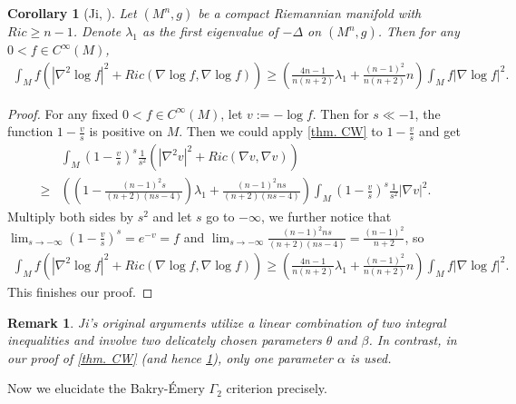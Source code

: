 \documentclass[11pt]{amsart}
\newtheorem{corollary}{Corollary}
\newtheorem{remark}{Remark}
\numberwithin{equation}{section}
\numberwithin{lemma}{section}
\numberwithin{proposition}{section}
\numberwithin{corollary}{section}
\numberwithin{remark}{section}
\begin{document}
    \begin{corollary}[Ji, \cite{Ji24}]\label{cor. recover Ji}
        Let $(M^n,g)$ be a compact Riemannian manifold with $Ric\geq n-1$. Denote $\lambda_1$ as the first eigenvalue of $-\Delta $ on $(M^n,g)$. Then for any $0<f\in C^{\infty}(M)$,
        \begin{align*}
        \int_M f(|\nabla^2\log f|^2+Ric(\nabla \log f,\nabla \log f))
        \geq 
        \left(
        \frac{4n-1}{n(n+2)}\lambda_1
            +\frac{(n-1)^2}{n(n+2)}n
        \right)
            \int_M f|\nabla \log f|^2.
        \end{align*}
\end{corollary}
\begin{proof}
    For any fixed $0<f\in C^{\infty}(M)$, let $v:=-\log f$. Then for $s\ll -1$, the function $1-\frac{v}{s}$ is positive on $M$. Then we could apply \cref{thm. CW} to $1-\frac{v}{s}$ and get
    \begin{align*}
        &\int_M \left(1-\frac{v}{s}\right)^s\frac{1}{s^2}
        \left(|\nabla^2 v|^2+Ric(\nabla v,\nabla v)\right)\\
        \geq &
        \left(\left(1-\frac{(n-1)^2s}{(n+2)(ns-4)}\right)\lambda_1
        +\frac{(n-1)^2ns}{(n+2)(ns-4)}
        \right)
        \int_M \left(1-\frac{v}{s}\right)^s\frac{1}{s^2}|\nabla v|^2.
    \end{align*}
    Multiply both sides by $s^2$ and let $s$ go to $-\infty$, we further notice that $\lim_{s\to-\infty}(1-\frac{v}{s})^s=e^{-v}=f$ and $\lim_{s\to-\infty}\frac{(n-1)^2ns}{(n+2)(ns-4)}=\frac{(n-1)^2}{n+2}$, so
    \begin{align*}
        \int_M f(|\nabla^2\log f|^2+Ric(\nabla \log f,\nabla \log f))
        \geq 
        \left(\frac{4n-1}{n(n+2)}\lambda_1
            +\frac{(n-1)^2}{n(n+2)}n
            \right)
        \int_M f|\nabla \log f|^2.
    \end{align*}
    This finishes our proof.
\end{proof}

\begin{remark}
    Ji's original arguments utilize a linear combination of two integral inequalities  and involve two delicately chosen parameters $\theta$ and $\beta$. In contrast, in our proof of \cref{thm. CW} (and hence \cref{cor. recover Ji}), only one parameter $\alpha$ is used.
\end{remark}

Now we elucidate the Bakry-\'Emery $\Gamma_2$ criterion precisely.
\end{document}
